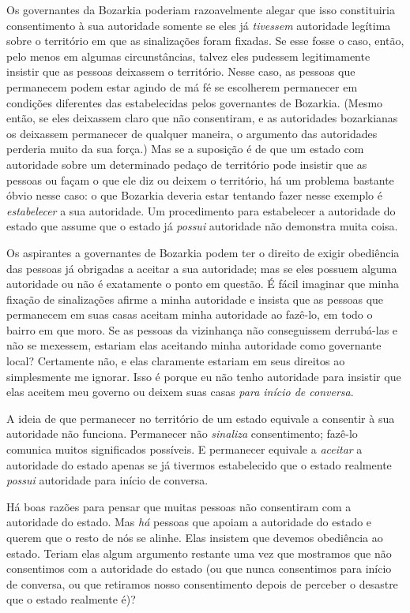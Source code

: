 Os governantes da Bozarkia poderiam razoavelmente alegar que isso constituiria consentimento à sua autoridade somente se eles já \emph{tivessem} autoridade legítima sobre o território em que as sinalizações foram fixadas. Se esse fosse o caso, então, pelo menos em algumas circunstâncias, talvez eles pudessem legitimamente insistir que as pessoas deixassem o território. Nesse caso, as pessoas que permanecem podem estar agindo de má fé se escolherem permanecer em condições diferentes das estabelecidas pelos governantes de Bozarkia. (Mesmo então, se eles deixassem claro que não consentiram, e as autoridades bozarkianas os deixassem permanecer de qualquer maneira, o argumento das autoridades perderia muito da sua força.) Mas se a suposição é de que um estado com autoridade sobre um determinado pedaço de território pode insistir que as pessoas ou façam o que ele diz ou deixem o território, há um problema bastante óbvio nesse caso: o que Bozarkia deveria estar tentando fazer nesse exemplo é \emph{estabelecer} a sua autoridade. Um procedimento para estabelecer a autoridade do estado que assume que o estado já \emph{possui} autoridade não demonstra muita coisa.

Os aspirantes a governantes de Bozarkia podem ter o direito de exigir obediência das pessoas já obrigadas a aceitar a sua autoridade; mas se eles possuem alguma autoridade ou não é exatamente o ponto em questão. É fácil imaginar que minha fixação de sinalizações afirme a minha autoridade e insista que as pessoas que permanecem em suas casas aceitam minha autoridade ao fazê-lo, em todo o bairro em que moro. Se as pessoas da vizinhança não conseguissem derrubá-las e não se mexessem, estariam elas aceitando minha autoridade como governante local? Certamente não, e elas claramente estariam em seus direitos ao simplesmente me ignorar. Isso é porque eu não tenho autoridade para insistir que elas aceitem meu governo ou deixem suas casas \emph{para início de conversa}.

A ideia de que permanecer no território de um estado equivale a consentir à sua autoridade não funciona. Permanecer não \emph{sinaliza} consentimento; fazê-lo comunica muitos significados possíveis. E permanecer equivale a \emph{aceitar} a autoridade do estado apenas se já tivermos estabelecido que o estado realmente \emph{possui} autoridade para início de conversa.

Há boas razões para pensar que muitas pessoas não consentiram com a autoridade do estado. Mas \emph{há} pessoas que apoiam a autoridade do estado e querem que o resto de nós se alinhe. Elas insistem que devemos obediência ao estado. Teriam elas algum argumento restante uma vez que mostramos que não consentimos com a autoridade do estado (ou que nunca consentimos para início de conversa, ou que retiramos nosso consentimento depois de perceber o desastre que o estado realmente é)?

